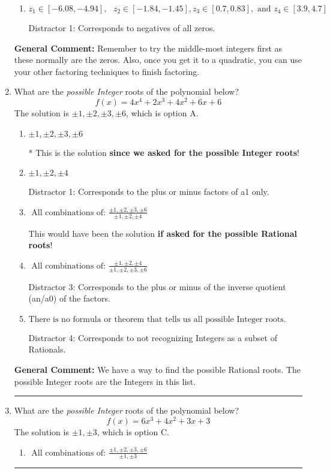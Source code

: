 \documentclass{extbook}[14pt]
\newcommand{\litem}[1]{\item #1

\rule{\textwidth}{0.4pt}}
\begin{document}
\begin{enumerate}
{\begin{enumerate}[label=\Alph*.]
 Distractor 2: Corresponds to inversing rational roots.
\item \( z_1 \in [-6.08, -4.94], \text{   }  z_2 \in [-1.84, -1.45], z_3 \in [0.7, 0.83], \text{   and   } z_4 \in [3.9, 4.7] \)

 Distractor 1: Corresponds to negatives of all zeros.
\end{enumerate}

\textbf{General Comment:} Remember to try the middle-most integers first as these normally are the zeros. Also, once you get it to a quadratic, you can use your other factoring techniques to finish factoring.
}
\litem{
What are the \textit{possible Integer} roots of the polynomial below?
\[ f(x) = 4x^{4} +2 x^{3} +4 x^{2} +6 x + 6 \]The solution is \( \pm 1,\pm 2,\pm 3,\pm 6 \), which is option A.\begin{enumerate}[label=\Alph*.]
\item \( \pm 1,\pm 2,\pm 3,\pm 6 \)

* This is the solution \textbf{since we asked for the possible Integer roots}!
\item \( \pm 1,\pm 2,\pm 4 \)

 Distractor 1: Corresponds to the plus or minus factors of a1 only.
\item \( \text{ All combinations of: }\frac{\pm 1,\pm 2,\pm 3,\pm 6}{\pm 1,\pm 2,\pm 4} \)

This would have been the solution \textbf{if asked for the possible Rational roots}!
\item \( \text{ All combinations of: }\frac{\pm 1,\pm 2,\pm 4}{\pm 1,\pm 2,\pm 3,\pm 6} \)

 Distractor 3: Corresponds to the plus or minus of the inverse quotient (an/a0) of the factors. 
\item \( \text{There is no formula or theorem that tells us all possible Integer roots.} \)

 Distractor 4: Corresponds to not recognizing Integers as a subset of Rationals.
\end{enumerate}

\textbf{General Comment:} We have a way to find the possible Rational roots. The possible Integer roots are the Integers in this list.
}
\litem{
What are the \textit{possible Integer} roots of the polynomial below?
\[ f(x) = 6x^{3} +4 x^{2} +3 x + 3 \]The solution is \( \pm 1,\pm 3 \), which is option C.\begin{enumerate}[label=\Alph*.]
\item \( \text{ All combinations of: }\frac{\pm 1,\pm 2,\pm 3,\pm 6}{\pm 1,\pm 3} \)


\end{enumerate}}
\end{enumerate}
\end{document}
